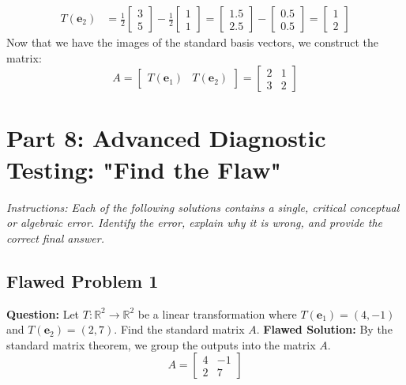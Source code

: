 \documentclass[11pt]{article}
\begin{document}
\begin{align*}
    T(\mathbf{e}_2) &= \frac{1}{2} \begin{bmatrix} 3 \\ 5 \end{bmatrix} - \frac{1}{2} \begin{bmatrix} 1 \\ 1 \end{bmatrix} = \begin{bmatrix} 1.5 \\ 2.5 \end{bmatrix} - \begin{bmatrix} 0.5 \\ 0.5 \end{bmatrix} = \begin{bmatrix} 1 \\ 2 \end{bmatrix}
\end{align*}
Now that we have the images of the standard basis vectors, we construct the matrix:
\[ A = \begin{bmatrix} T(\mathbf{e}_1) & T(\mathbf{e}_2) \end{bmatrix} = \begin{bmatrix} 2 & 1 \\ 3 & 2 \end{bmatrix} \]

\newpage
\section{Part 8: Advanced Diagnostic Testing: "Find the Flaw"}
\textit{Instructions: Each of the following solutions contains a single, critical conceptual or algebraic error. Identify the error, explain why it is wrong, and provide the correct final answer.}

\subsection*{Flawed Problem 1}
\textbf{Question:} Let $T: \mathbb{R}^2 \to \mathbb{R}^2$ be a linear transformation where $T(\mathbf{e}_1) = (4, -1)$ and $T(\mathbf{e}_2) = (2, 7)$. Find the standard matrix $A$.
\textbf{Flawed Solution:} 
By the standard matrix theorem, we group the outputs into the matrix $A$.
\[ A = \begin{bmatrix} 4 & -1 \\ 2 & 7 \end{bmatrix} \]

\vspace{2cm}
\end{document}
